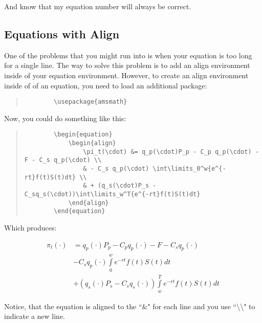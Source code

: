 And know that my equation number will always be correct.

\subsection{Equations with Align}

One of the problems that you might run into is when your equation is too long for a single line.  The way to solve this problem is to add an align environment inside of your equation environment.  However, to create an align environment inside of of an equation, you need to load an additional package:

\begin{quote}
	\begin{verbatim}
		\usepackage{amsmath}
	\end{verbatim}
\end{quote}

Now, you could do something like this:

\begin{quote}
	\begin{verbatim}
		\begin{equation}
			\begin{align}
	  			\pi_t(\cdot) &= q_p(\cdot)P_p - C_p q_p(\cdot) - F - C_s q_p(\cdot) \\
	  			& - C_s q_p(\cdot) \int\limits_0^w{e^{-rt}f(t)S(t)dt} \\
	  			& + (q_s(\cdot)P_s - C_sq_s(\cdot))\int\limits_w^T{e^{-rt}f(t)S(t)dt}
	 		\end{align}
		\end{equation}
	\end{verbatim}
\end{quote}

Which produces:

\begin{equation}
	\begin{align}
		\pi_t(\cdot) &= q_p(\cdot)P_p - C_p q_p(\cdot) - F - C_s q_p(\cdot) \\
	  	& - C_s q_p(\cdot) \int\limits_0^w{e^{-rt}f(t)S(t)dt} \\
	  	& + (q_s(\cdot)P_s - C_sq_s(\cdot))\int\limits_w^T{e^{-rt}f(t)S(t)dt}
	 \end{align}
\end{equation}

Notice, that the equation is aligned to the ``\&" for each line and you use ``\textbackslash \textbackslash" to indicate a new line.

